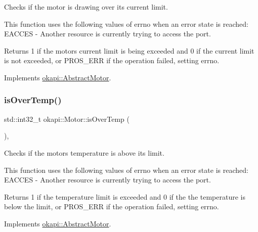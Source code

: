 Checks if the motor is drawing over its current limit.

This function uses the following values of errno when an error state is reached\+: E\+A\+C\+C\+ES -\/ Another resource is currently trying to access the port.

\begin{DoxyReturn}{Returns}
1 if the motor\textquotesingle{}s current limit is being exceeded and 0 if the current limit is not exceeded, or P\+R\+O\+S\+\_\+\+E\+RR if the operation failed, setting errno. 
\end{DoxyReturn}


Implements \mbox{\hyperlink{classokapi_1_1AbstractMotor_a3d365496ebb8566c0a12611f090c5231}{okapi\+::\+Abstract\+Motor}}.

\mbox{\label{classokapi_1_1Motor_a8a51f7dede42f768280b73d85a528d91}} 
\subsubsection{\texorpdfstring{isOverTemp()}{isOverTemp()}}
{\footnotesize\ttfamily std\+::int32\+\_\+t okapi\+::\+Motor\+::is\+Over\+Temp (\begin{DoxyParamCaption}{ }\end{DoxyParamCaption})\hspace{0.3cm}{\ttfamily [override]}, {\ttfamily [virtual]}}

Checks if the motor\textquotesingle{}s temperature is above its limit.

This function uses the following values of errno when an error state is reached\+: E\+A\+C\+C\+ES -\/ Another resource is currently trying to access the port.

\begin{DoxyReturn}{Returns}
1 if the temperature limit is exceeded and 0 if the the temperature is below the limit, or P\+R\+O\+S\+\_\+\+E\+RR if the operation failed, setting errno. 
\end{DoxyReturn}


Implements \mbox{\hyperlink{classokapi_1_1AbstractMotor_a61e24db43d1fe790b173cc0b4e27922f}{okapi\+::\+Abstract\+Motor}}.

\mbox{\label{classokapi_1_1Motor_ab4edaf8e4ed576fa2003d4cc8e02c364}} 
